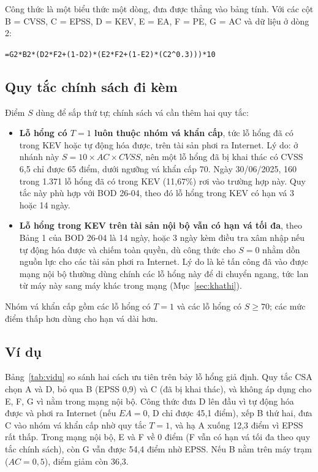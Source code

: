 \documentclass[conference]{IEEEtran}
\begin{document}
Công thức là một biểu thức một dòng, đưa được thẳng vào bảng tính. Với các cột B = CVSS, C = EPSS, D = KEV,
E = EA, F = PE, G = AC và dữ liệu ở dòng 2:
\begin{center}\footnotesize\verb|=G2*B2*(D2*F2+(1-D2)*(E2*F2+(1-E2)*(C2^0.3)))*10|\end{center}

\subsection{Quy tắc chính sách đi kèm}

Điểm $S$ dùng để sắp thứ tự; chính sách vá cần thêm hai quy tắc:
\begin{itemize}
\item \textbf{Lỗ hổng có $T = 1$ luôn thuộc nhóm vá khẩn cấp}, tức lỗ hổng đã có trong KEV hoặc tự động
hóa được, trên tài sản phơi ra Internet. Lý do: ở nhánh này $S = 10 \times AC \times \mathit{CVSS}$, nên
một lỗ hổng đã bị khai thác có CVSS 6,5 chỉ được 65 điểm, dưới ngưỡng vá khẩn cấp 70. Ngày 30/06/2025,
160 trong 1.371 lỗ hổng đã có trong KEV (11,67\%) rơi vào trường hợp này. Quy tắc này phù hợp với BOD
26-04, theo đó lỗ hổng trong KEV có hạn vá 3 hoặc 14 ngày.
\item \textbf{Lỗ hổng trong KEV trên tài sản nội bộ vẫn có hạn vá tối đa}, theo Bảng 1 của BOD 26-04 là 14 ngày, hoặc 3 ngày kèm điều tra xâm nhập nếu tự động hóa được và chiếm toàn quyền,
dù công thức cho $S = 0$ nhằm dồn nguồn lực cho các tài sản phơi ra Internet. Lý do là kẻ tấn công đã vào được mạng nội
bộ thường dùng chính các lỗ hổng này để di chuyển ngang, tức lan từ máy này sang máy khác trong mạng (Mục~\ref{sec:khathi}).
\end{itemize}
Nhóm vá khẩn cấp gồm các lỗ hổng có $T = 1$ và các lỗ hổng có $S \ge 70$; các mức điểm thấp hơn dùng
cho hạn vá dài hơn.

\subsection{Ví dụ}

Bảng~\ref{tab:vidu} so sánh hai cách ưu tiên trên bảy lỗ hổng giả định. Quy tắc CSA chọn A và D, bỏ qua B (EPSS 0,9) và C
(đã bị khai thác), và không áp dụng cho E, F, G vì nằm trong mạng nội bộ. Công thức đưa D lên đầu vì tự
động hóa được và phơi ra Internet (nếu $\mathit{EA} = 0$, D chỉ được 45,1 điểm), xếp B thứ hai, đưa C vào
nhóm vá khẩn cấp nhờ quy tắc $T = 1$, và hạ A xuống 12,3 điểm vì EPSS rất thấp. Trong mạng nội bộ, E và F
về 0 điểm (F vẫn có hạn vá tối đa theo quy tắc chính sách), còn G vẫn được 54,4 điểm nhờ EPSS. Nếu B nằm
trên máy trạm ($AC = 0{,}5$), điểm giảm còn 36,3.
\end{document}
